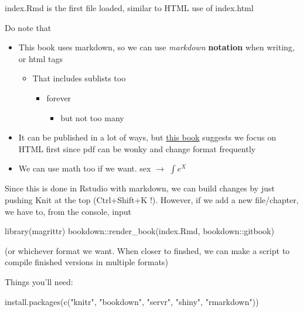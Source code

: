 \documentclass[
]{book}
\newenvironment{Shaded}{\begin{snugshade}}{\end{snugshade}}
\newcommand{\FunctionTok}[1]{\textcolor[rgb]{0.00,0.00,0.00}{#1}}
\newcommand{\NormalTok}[1]{#1}
\newcommand{\SpecialCharTok}[1]{\textcolor[rgb]{0.00,0.00,0.00}{#1}}
\newcommand{\StringTok}[1]{\textcolor[rgb]{0.31,0.60,0.02}{#1}}
\providecommand{\tightlist}{%
  \setlength{\itemsep}{0pt}\setlength{\parskip}{0pt}}
\theoremstyle{definition}
\theoremstyle{definition}
\theoremstyle{definition}
\theoremstyle{remark}
\begin{document}
index.Rmd is the first file loaded, similar to HTML use of index.html

Do note that

\begin{itemize}
\tightlist
\item
  This book uses markdown, so we can use \emph{markdown} \textbf{notation} when writing, or html tags

  \begin{itemize}
  \tightlist
  \item
    That includes sublists too

    \begin{itemize}
    \tightlist
    \item
      forever

      \begin{itemize}
      \tightlist
      \item
        but not too many
      \end{itemize}
    \end{itemize}
  \end{itemize}
\item
  It can be published in a lot of ways, but \href{https://bookdown.org/yihui/bookdown/}{this book} suggests we focus on HTML first since pdf can be wonky and change format frequently
\item
  We can use math too if we want. sex \(\rightarrow\) \(\int e^X\)
\end{itemize}

Since this is done in Rstudio with markdown, we can build changes by just pushing Knit at the top (Ctrl+Shift+K !). However, if we add a new file/chapter, we have to, from the console, input

\begin{Shaded}
\begin{Highlighting}[]
\FunctionTok{library}\NormalTok{(magrittr)}
\NormalTok{bookdown}\SpecialCharTok{::}\FunctionTok{render\_book}\NormalTok{(}\StringTok{\textquotesingle{}index.Rmd\textquotesingle{}}\NormalTok{, }\StringTok{\textquotesingle{}bookdown::gitbook\textquotesingle{}}\NormalTok{)}
\end{Highlighting}
\end{Shaded}

(or whichever format we want. When closer to finshed, we can make a script to compile finished versions in multiple formats)

Things you'll need:

\begin{Shaded}
\begin{Highlighting}[]
\FunctionTok{install.packages}\NormalTok{(}\FunctionTok{c}\NormalTok{(}\StringTok{"knitr"}\NormalTok{, }\StringTok{"bookdown"}\NormalTok{, }\StringTok{"servr"}\NormalTok{, }\StringTok{"shiny"}\NormalTok{, }\StringTok{"rmarkdown"}\NormalTok{))}
\end{Highlighting}
\end{Shaded}
\end{document}
